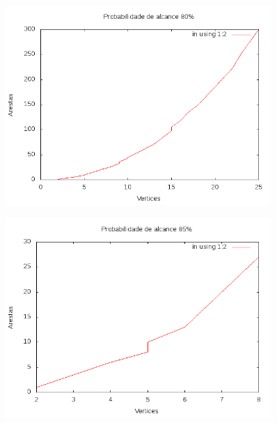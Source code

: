 \documentclass{article}
\begin{document}
\begin{figure}[h]
	\includegraphics[width=0.9\textwidth]{80.png}
\end{figure}
\begin{figure}[h]
	\includegraphics[width=0.9\textwidth]{85.png}
\end{figure}
\end{document}
